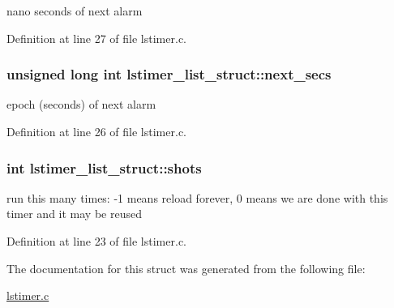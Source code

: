 nano seconds of next alarm 



Definition at line 27 of file lstimer.\-c.

\hypertarget{structlstimer__list__struct_af0dcaad37472462c9f27d54ed0ceb75d}{
\subsubsection[{next\-\_\-secs}]{\setlength{\rightskip}{0pt plus 5cm}unsigned long int lstimer\-\_\-list\-\_\-struct\-::next\-\_\-secs}}\label{structlstimer__list__struct_af0dcaad37472462c9f27d54ed0ceb75d}


epoch (seconds) of next alarm 



Definition at line 26 of file lstimer.\-c.

\hypertarget{structlstimer__list__struct_ac7ab4cd1f3065156f95b49e66bf05283}{
\subsubsection[{shots}]{\setlength{\rightskip}{0pt plus 5cm}int lstimer\-\_\-list\-\_\-struct\-::shots}}\label{structlstimer__list__struct_ac7ab4cd1f3065156f95b49e66bf05283}


run this many times\-: -\/1 means reload forever, 0 means we are done with this timer and it may be reused 



Definition at line 23 of file lstimer.\-c.



The documentation for this struct was generated from the following file\-:\begin{DoxyCompactItemize}
\item 
\hyperlink{lstimer_8c}{lstimer.\-c}\end{DoxyCompactItemize}
